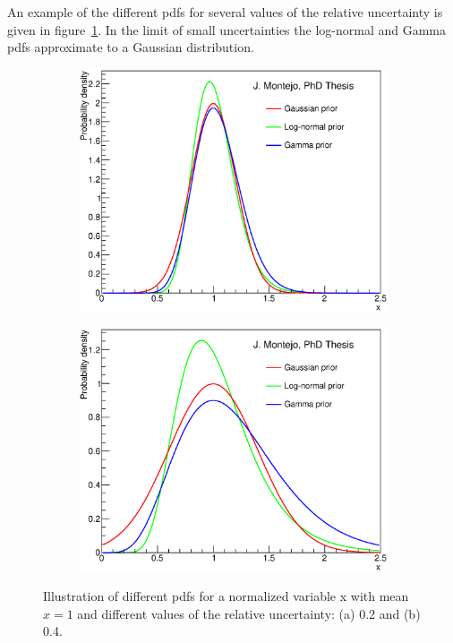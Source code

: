     An example of the different pdfs for several values of the relative uncertainty is given in figure~\ref{fig:pdf}. In the limit of small uncertainties the log-normal and Gamma pdfs approximate to a Gaussian distribution.
\begin{figure}[!t]
  \begin{center}
    \begin{subfigure}{0.49\textwidth}
        \includegraphics[width=\textwidth]{Statistics/Figures/prior0_20.eps} 
        \caption{}
      \end{subfigure}
    \begin{subfigure}{0.49\textwidth}
        \includegraphics[width=\textwidth]{Statistics/Figures/prior0_40.eps}
        \caption{}
      \end{subfigure}
  \end{center}
  \caption{Illustration of different pdfs for a normalized variable x with mean $\hat{x}=1$ and different values of the relative uncertainty: 
(a) 0.2 and (b) 0.4.
}
  \label{fig:pdf}
\end{figure}

